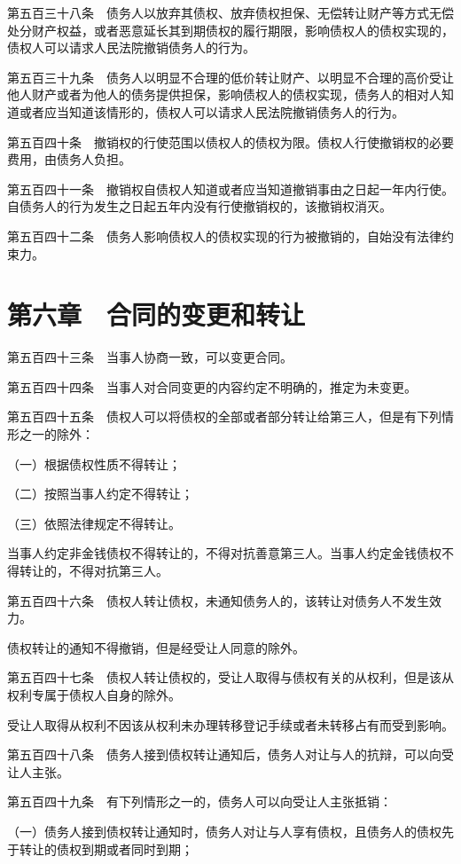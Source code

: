\documentclass[UTF8,12pt,a4paper]{ctexbook}
\begin{document}
第五百三十八条　债务人以放弃其债权、放弃债权担保、无偿转让财产等方式无偿处分财产权益，或者恶意延长其到期债权的履行期限，影响债权人的债权实现的，债权人可以请求人民法院撤销债务人的行为。

第五百三十九条　债务人以明显不合理的低价转让财产、以明显不合理的高价受让他人财产或者为他人的债务提供担保，影响债权人的债权实现，债务人的相对人知道或者应当知道该情形的，债权人可以请求人民法院撤销债务人的行为。

第五百四十条　撤销权的行使范围以债权人的债权为限。债权人行使撤销权的必要费用，由债务人负担。

第五百四十一条　撤销权自债权人知道或者应当知道撤销事由之日起一年内行使。自债务人的行为发生之日起五年内没有行使撤销权的，该撤销权消灭。

第五百四十二条　债务人影响债权人的债权实现的行为被撤销的，自始没有法律约束力。

\section*{第六章　合同的变更和转让}

第五百四十三条　当事人协商一致，可以变更合同。

第五百四十四条　当事人对合同变更的内容约定不明确的，推定为未变更。

第五百四十五条　债权人可以将债权的全部或者部分转让给第三人，但是有下列情形之一的除外：

（一）根据债权性质不得转让；

（二）按照当事人约定不得转让；

（三）依照法律规定不得转让。

当事人约定非金钱债权不得转让的，不得对抗善意第三人。当事人约定金钱债权不得转让的，不得对抗第三人。

第五百四十六条　债权人转让债权，未通知债务人的，该转让对债务人不发生效力。

债权转让的通知不得撤销，但是经受让人同意的除外。

第五百四十七条　债权人转让债权的，受让人取得与债权有关的从权利，但是该从权利专属于债权人自身的除外。

受让人取得从权利不因该从权利未办理转移登记手续或者未转移占有而受到影响。

第五百四十八条　债务人接到债权转让通知后，债务人对让与人的抗辩，可以向受让人主张。

第五百四十九条　有下列情形之一的，债务人可以向受让人主张抵销：

（一）债务人接到债权转让通知时，债务人对让与人享有债权，且债务人的债权先于转让的债权到期或者同时到期；
\end{document}

